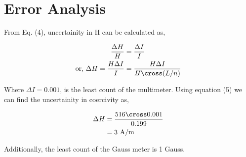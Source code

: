 \section{Error Analysis}
From Eq. (4), uncertainity in H can be calculated as,

\begin{align}
    \frac{\Delta H}{H} &= \frac{\Delta I}{I} \nonumber \\
    \text{or, }\Delta H = \frac{H\Delta I}{I} &= \frac{H\Delta I}{H\cross (L/n)}
\end{align}

Where $\Delta I=0.001$, is the least count of the multimeter. Using equation (5) we can find the uncertainity in coercivity as,

\begin{align*}
    \Delta H &= \frac{516 \cross 0.001}{0.199}\\
    &=3 \text{ A/m} 
\end{align*}

Additionally, the least count of the Gauss meter is 1 Gauss.